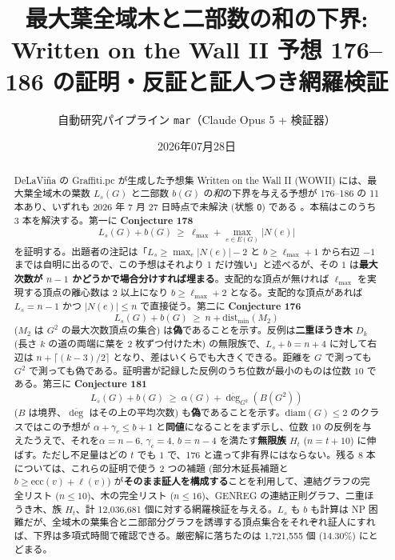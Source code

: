 \documentclass[paper=a4,fontsize=10.5pt,jafontsize=10.5pt]{jlreq}
\title{最大葉全域木と二部数の和の下界: Written on the Wall II 予想 176--186 の証明・反証と証人つき網羅検証}
\author{自動研究パイプライン \texttt{mar}（Claude Opus 5 + 検証器）}
\date{2026年07月28日}
\theoremstyle{plain}
\theoremstyle{definition}
\begin{document}
\maketitle

\begin{abstract}
DeLaViña の Graffiti.pc が生成した予想集 Written on the Wall II (WOWII) には、最大葉全域木の葉数 $L_s(G)$ と二部数 $b(G)$ の\emph{和}の下界を与える予想が 176--186 の 11 本あり、いずれも 2026 年 7 月 27 日時点で未解決 (状態 \texttt{O}) である \cite{wowii}。本稿はこのうち 3 本を解決する。第一に \textbf{Conjecture 178}
\[ L_s(G) + b(G) \ \ge \ \ell_{\max} + \max_{e \in E(G)} |N(e)| \]
を証明する。出題者の注記は「$L_s \ge \max_e |N(e)| - 2$ と $b \ge \ell_{\max} + 1$ から右辺 $-1$ までは自明に出るので、この予想はそれより 1 だけ強い」と述べるが、その $1$ は\textbf{最大次数が $n-1$ かどうかで場合分けすれば埋まる}。支配的な頂点が無ければ $\ell_{\max}$ を実現する頂点の離心数は $2$ 以上になり $b \ge \ell_{\max} + 2$ となる。支配的な頂点があれば $L_s = n - 1$ かつ $|N(e)| \le n$ で直接従う。第二に \textbf{Conjecture 176}
\[ L_s(G) + b(G) \ \ge \ n + \mathrm{dist}_{\min}(M_2) \]
($M_2$ は $G^2$ の最大次数頂点の集合) は\textbf{偽}であることを示す。反例は\textbf{二重ほうき木} $D_k$ (長さ $k$ の道の両端に葉を 2 枚ずつ付けた木) の無限族で、$L_s + b = n + 4$ に対して右辺は $n + \lceil (k-3)/2 \rceil$ となり、差はいくらでも大きくできる。距離を $G$ で測っても $G^2$ で測っても偽である。証明書が記録した反例のうち位数が最小のものは位数 $10$ である。第三に \textbf{Conjecture 181}
\[ L_s(G) + b(G) \ \ge \ \alpha(G) + \overline{\deg}_{G^2}(B(G^2)) \]
($B$ は境界、$\overline{\deg}$ はその上の平均次数) も\textbf{偽}であることを示す。$\mathrm{diam}(G) \le 2$ のクラスではこの予想が $\alpha + \gamma_c \le b + 1$ と\textbf{同値}になることをまず示し、位数 $10$ の反例を与えたうえで、それを$\alpha = n - 6$, $\gamma_c = 4$, $b = n - 4$ を満たす\textbf{無限族} $H_t$ ($n = t + 10$) に伸ばす。ただし不足量はどの $t$ でも $1$ で、176 と違って非有界にはならない。残る 8 本については、これらの証明で使う 2 つの補題 (部分木延長補題と $b \ge \mathrm{ecc}(v) + \ell(v)$) が\textbf{そのまま証人を構成する}ことを利用して、連結グラフの完全リスト ($n \le 10$)、木の完全リスト ($n \le 16$)、GENREG の連結正則グラフ、二重ほうき木、族 $H_t$、計 12,036,681 個に対する網羅検証を与える。$L_s$ も $b$ も計算は NP 困難だが、全域木の葉集合と二部部分グラフを誘導する頂点集合をそれぞれ証人にすれば、下界は多項式時間で確認できる。厳密解に落ちたのは 1,721,555 個 (14.30\%) にとどまる。
\end{abstract}
\end{document}
